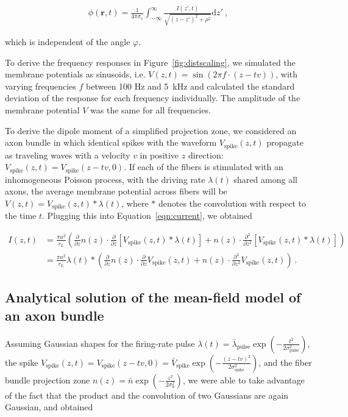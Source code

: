 \documentclass[]{elife}
\begin{document}
\begin{align}\label{eqn:simple_field_pot}
    \phi(\mathbf{r},t) =\frac{1}{4\pi\sigma_{e}}\int_{-\infty}^{\infty}\frac{I(z',t)}{\sqrt{(z-z')^2 + \rho^2}}\textrm{d}z' \ ,
\end{align}

which is independent of the angle \(\varphi\).

To derive the frequency responses in Figure~\ref{fig:distscaling}, we
simulated the membrane potentials as sinusoids, i.e.
\(V(z,t) = \sin\left(2\pi f\cdot\left(z-tv\right)\right)\), with varying
frequencies \(f\) between 100 Hz and 5~kHz and calculated the standard
deviation of the response for each frequency individually. The amplitude
of the membrane potential \(V\) was the same for all frequencies.

To derive the dipole moment of a simplified projection zone, we
considered an axon bundle in which identical spikes with the waveform
\(V_\text{spike}(z,t)\) propagate as traveling waves with a velocity
\(v\) in positive \(z\) direction:
\(V_\text{spike}(z,t) = V_\text{spike}(z-tv,0)\). If each of the fibers
is stimulated with an inhomogeneous Poisson process, with the driving
rate \(\lambda(t)\) shared among all axons, the average membrane
potential across fibers will be
\(V(z,t) = V_\text{spike}(z,t)\ast \lambda(t)\), where \(\ast\) denotes
the convolution with respect to the time \(t\). Plugging this into
Equation~\ref{eqn:current}, we obtained

\begin{align}
I(z,t)& = \frac{\pi a^2}{r_L}\left(\frac{\partial}{\partial z}n(z)\cdot\frac{\partial}{\partial z}\left[V_\text{spike}(z,t)\ast \lambda(t)\right]+n(z)\cdot\frac{\partial ^2}{\partial z^2}\left[V_\text{spike}(z,t)\ast \lambda(t)\right] \right) \\ 
& = \frac{\pi a^2}{r_L}\lambda(t)\ast\left(\frac{\partial}{\partial z}n(z)\cdot\frac{\partial}{\partial z}V_\text{spike}(z,t)+n(z)\cdot\frac{\partial ^2}{\partial z^2}V_\text{spike}(z,t) \right) \ .
\end{align}

\subsection{Analytical solution of the mean-field model of an axon
bundle}\label{analytical-solution-of-the-mean-field-model-of-an-axon-bundle}

Assuming Gaussian shapes for the firing-rate pulse
\(\lambda(t) = \bar\lambda_{\text{pulse}} \exp\left(-\frac{t^2}{2\sigma_\text{pulse}^2}\right)\),
the spike
\(V_\text{spike}(z,t) = V_\text{spike}(z-tv,0) = \bar{V}_\text{spike} \exp\left(-\frac{(z-tv)^2}{2\sigma_\text{spike}^2}\right)\),
and the fiber bundle projection zone
\(n(z) = \bar{n} \exp\left(-\frac{z^2}{2\sigma_\text{n}^2}\right)\), we
were able to take advantage of the fact that the product and the
convolution of two Gaussians are again Gaussian, and obtained
\end{document}
